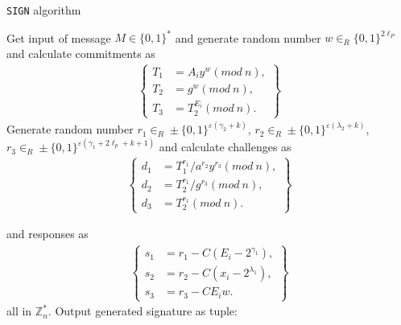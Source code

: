 \begin{algorithm}
\caption{\texttt{SIGN} algorithm}
\begin{algorithmic}[1]
\vspace{10pt}
\STATE Get input of message $M \in \{0, 1\}^*$ and generate random number $w \in_R \{ 0,1 \}^{2\ell_P}$ and calculate commitments as
\begin{eqnarray*}
\left\lbrace
  \begin{aligned}
T_1 &= A_i y^w (mod~n),\\
T_2 &= g^w (mod~n),\\
T_3 &= T_2^{E_i}(mod~n).
\end{aligned}
  \right\rbrace
\end{eqnarray*}
\STATE Generate random number
$r_1 \in_R \pm \{ 0,1 \}^{\varepsilon(\gamma_2 + k)}$, 
$r_2 \in_R \pm \{ 0,1 \}^{\varepsilon(\lambda_2 + k)}$, 
$r_3 \in_R \pm \{ 0,1 \}^{\varepsilon(\gamma_1 + 2\ell_p + k + 1)}$
and calculate challenges as
\begin{eqnarray*}
\left\lbrace
  \begin{aligned}
d_1 &= T_1^{r_1} / a^{r_2}y^{r_3} (mod~n),\\
d_2 &= T_2^{r_1} / g^{r_3} (mod~n),\\
d_3 &= T_2^{r_1} (mod~n).
\end{aligned}
  \right\rbrace
\end{eqnarray*}
\begin{center}
\end{center}
and responses as
\begin{eqnarray*}
\left\lbrace
  \begin{aligned}
s_1 &= r_1 - C(E_i- 2^{\gamma_1}),\\
s_2 &= r_2 - C(x_i- 2^{\lambda_1}),\\
s_3 &= r_3 - C E_i w.
\end{aligned}
  \right\rbrace
\end{eqnarray*}
\hfill all in $\mathbb{Z}_n^*.$
\STATE Output generated signature as tuple: 
\begin{center}
\end{center}
\vspace{10pt}
\end{algorithmic}
\end{algorithm}

